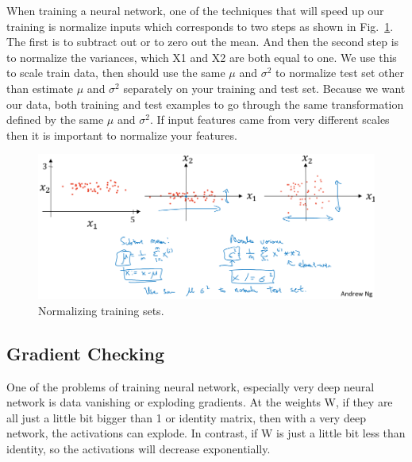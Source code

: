 \documentclass[a4paper]{article}
\begin{document}
When training a neural network, one of the techniques that will speed up our training is normalize inputs which corresponds to two steps as shown in Fig.~\ref{p12}. The first is to subtract out or to zero out the mean. And then the second step is to normalize the variances, which X1 and X2 are both equal to one. We use this to scale train data, then should use the same $\mu$ and $\sigma^2$ to normalize test set other than estimate $\mu$ and $\sigma^2$ separately on your training and test set. Because we want our data, both training and test examples to go through the same transformation defined by the same $\mu$ and $\sigma^2$. If input features came from very different scales then it is important to normalize your features.
\begin{figure}
	\begin{center}
		\includegraphics[scale=0.3]{figures/13.png}
	\end{center}
	\caption{Normalizing training sets.}
	\label{p12}
\end{figure}

\subsection{Gradient Checking}
One of the problems of training neural network, especially very deep neural network is data vanishing or exploding gradients. At the weights W, if they are all just a little bit bigger than 1 or identity matrix, then with a very deep network, the activations can explode. In contrast, if W is just a little bit less than identity, so the activations will decrease exponentially.
\end{document}
